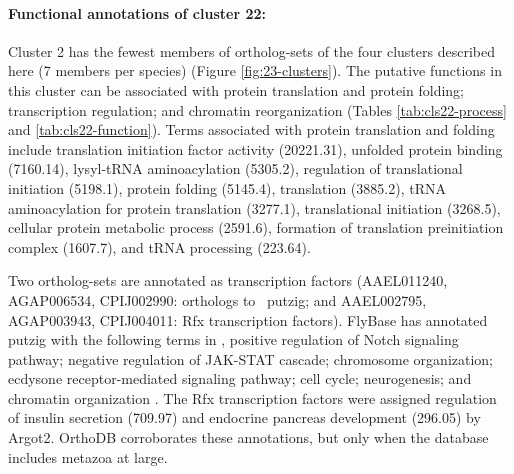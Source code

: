 \paragraph*{Functional annotations of cluster 22:}






Cluster 2 has the fewest members of ortholog-sets of the four clusters described here (7 members per species) (Figure \ref{fig:23-clusters}).
%
The putative functions in this cluster can be associated with protein translation and protein folding; transcription regulation; and chromatin reorganization (Tables \ref{tab:cls22-process} and \ref{tab:cls22-function}).
%
Terms associated with protein translation and folding include translation initiation factor activity (20221.31), unfolded protein binding (7160.14), lysyl-tRNA aminoacylation (5305.2), regulation of translational initiation (5198.1), protein folding (5145.4), translation (3885.2), tRNA aminoacylation for protein translation (3277.1), translational initiation (3268.5), cellular protein metabolic process (2591.6), formation of translation preinitiation complex (1607.7), and tRNA processing (223.64).




Two ortholog-sets are annotated as transcription factors (AAEL011240, AGAP006534, CPIJ002990: orthologs to \Dm\ putzig; and AAEL002795, AGAP003943, CPIJ004011: Rfx transcription factors).
%
FlyBase has annotated putzig with the following terms in \Dm, positive regulation of Notch signaling pathway; negative regulation of JAK-STAT cascade; chromosome organization; ecdysone receptor-mediated signaling pathway; cell cycle; neurogenesis; and chromatin organization \cite{Marygold2013}.
%
The Rfx transcription factors were assigned regulation of insulin secretion (709.97) and endocrine pancreas development (296.05) by \gls{Argot2}.
%
OrthoDB corroborates these annotations, but only when the database includes metazoa at large.

